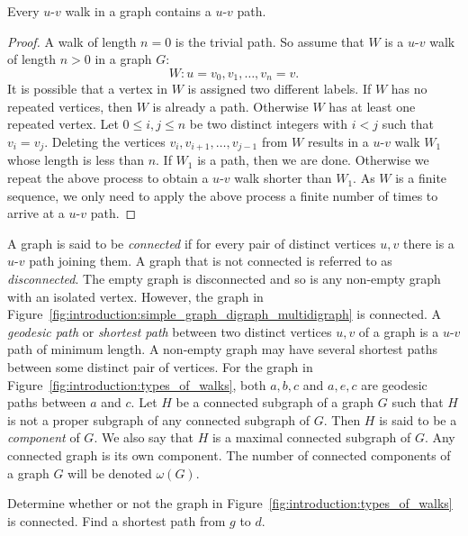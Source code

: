 \begin{theorem}
\label{thm:introduction:every_walk_has_a_path}
Every $u$-$v$ walk in a graph contains a $u$-$v$ path.
\end{theorem}

\begin{proof}
A walk of length $n = 0$ is the trivial path. So assume that $W$ is a
$u$-$v$ walk of length $n > 0$ in a graph $G$:
\[
W: u = v_0, v_1, \dots, v_n = v.
\]
It is possible that a vertex in $W$ is assigned two different
labels. If $W$ has no repeated vertices, then $W$ is already a
path. Otherwise $W$ has at least one repeated vertex. Let
$0 \leq i,j \leq n$ be two distinct integers with $i < j$ such that
$v_i = v_j$. Deleting the vertices $v_i, v_{i+1}, \dots, v_{j-1}$ from
$W$ results in a $u$-$v$ walk $W_1$ whose length is less than $n$. If
$W_1$ is a path, then we are done. Otherwise we repeat the above
process to obtain a $u$-$v$ walk shorter than $W_1$. As $W$ is a
finite sequence, we only need to apply the above process a finite
number of times to arrive at a $u$-$v$ path.
\end{proof}

A graph is said to be \emph{connected} if for every pair of distinct
vertices $u, v$ there is a $u$-$v$ path joining them. A graph that is
not connected is referred to as \emph{disconnected}. The empty graph
is disconnected and so is any non-empty graph with an isolated
vertex. However, the graph in
Figure~\ref{fig:introduction:simple_graph_digraph_multidigraph} is
connected. A \emph{geodesic path} or \emph{shortest path} between two
distinct vertices $u,v$ of a graph is a $u$-$v$ path of minimum
length. A non-empty graph may have several shortest paths between some
distinct pair of vertices. For the graph in
Figure~\ref{fig:introduction:types_of_walks}, both $a,b,c$ and $a,e,c$
are geodesic paths between $a$ and $c$. Let $H$ be a connected
subgraph of a graph $G$ such that $H$ is not a proper subgraph of any
connected subgraph of $G$. Then $H$ is said to be a
\emph{component} of $G$. We also say that $H$ is a
maximal connected subgraph of $G$. Any connected graph is its own
component. The number of connected
components of a graph $G$ will be denoted $\omega(G)$.
\index{$\omega$}

\begin{example}
Determine whether or not the graph in
Figure~\ref{fig:introduction:types_of_walks} is connected. Find a
shortest path from $g$ to $d$.
\end{example}

